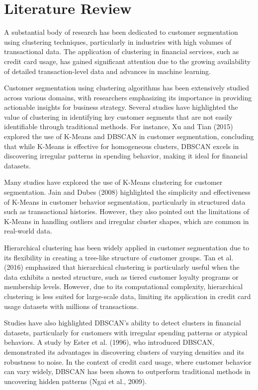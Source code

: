 \documentclass[runningheads,a4paper]{llncs}
\begin{document}
\section{Literature Review}

A substantial body of research has been dedicated to customer segmentation using clustering techniques, particularly in industries with high volumes of transactional data. The application of clustering in financial services, such as credit card usage, has gained significant attention due to the growing availability of detailed transaction-level data and advances in machine learning.

Customer segmentation using clustering algorithms has been extensively studied across various domains, with researchers emphasizing its importance in providing actionable insights for business strategy. Several studies have highlighted the value of clustering in identifying key customer segments that are not easily identifiable through traditional methods. For instance, Xu and Tian (2015) explored the use of K-Means and DBSCAN in customer segmentation, concluding that while K-Means is effective for homogeneous clusters, DBSCAN excels in discovering irregular patterns in spending behavior, making it ideal for financial datasets.

Many studies have explored the use of K-Means clustering for customer segmentation. Jain and Dubes (2008) highlighted the simplicity and effectiveness of K-Means in customer behavior segmentation, particularly in structured data such as transactional histories. However, they also pointed out the limitations of K-Means in handling outliers and irregular cluster shapes, which are common in real-world data.

Hierarchical clustering has been widely applied in customer segmentation due to its flexibility in creating a tree-like structure of customer groups. Tan et al. (2016) emphasized that hierarchical clustering is particularly useful when the data exhibits a nested structure, such as tiered customer loyalty programs or membership levels. However, due to its computational complexity, hierarchical clustering is less suited for large-scale data, limiting its application in credit card usage datasets with millions of transactions.

Studies have also highlighted DBSCAN's ability to detect clusters in financial datasets, particularly for customers with irregular spending patterns or atypical behaviors. A study by Ester et al. (1996), who introduced DBSCAN, demonstrated its advantages in discovering clusters of varying densities and its robustness to noise. In the context of credit card usage, where customer behavior can vary widely, DBSCAN has been shown to outperform traditional methods in uncovering hidden patterns (Ngai et al., 2009).
\end{document}
